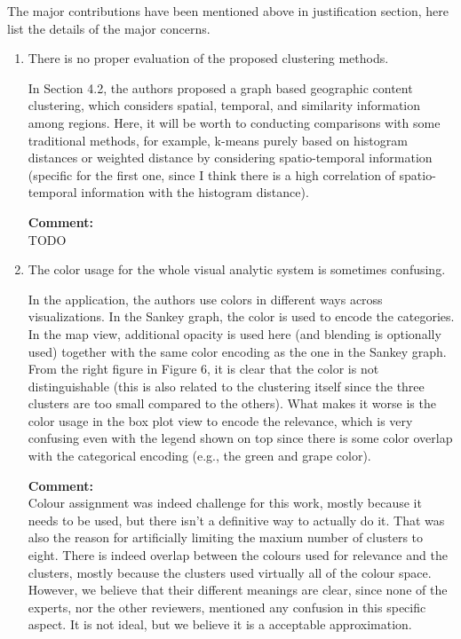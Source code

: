 \documentclass{article}
\newcommand{\reply}[1]{\begin{tcolorbox}\noindent\textbf{Comment:}\\#1\hfill\end{tcolorbox}}
\begin{document}
\begin{itemize}
{    The major contributions have been mentioned above in justification section, here
    list the details of the major concerns.
    \begin{enumerate}

    \item{There is no proper evaluation of the proposed clustering methods. 

    In Section 4.2, the authors proposed a graph based geographic content clustering,
    which considers spatial, temporal, and similarity information among regions. Here,
    it will be worth to conducting comparisons with some traditional methods, for
    example, k-means purely based on histogram distances or weighted distance by
    considering spatio-temporal information (specific for the first one, since I think
    there is a high correlation of spatio-temporal information with the histogram
    distance).
    \reply{TODO}
    }

    \item{The color usage for the whole visual analytic system is sometimes confusing. 

    In the application, the authors use colors in different ways across
    visualizations. In the Sankey graph, the color is used to encode the categories.
    In the map view, additional opacity is used here (and blending is optionally used)
    together with the same color encoding as the one in the Sankey graph. From the
    right figure in Figure 6, it is clear that the color is not distinguishable (this
    is also related to the clustering itself since the three clusters are too small
    compared to the others). What makes it worse is the color usage in the box plot
    view to encode the relevance, which is very confusing even with the legend shown
    on top since there is some color overlap with the categorical encoding (e.g., the
    green and grape color).

    \reply{Colour assignment was indeed challenge for this work, mostly because
    it needs to be used, but there isn't a definitive way to actually do it.
    That was also the reason for artificially limiting the maxium number of
    clusters to eight. There is indeed overlap between the colours used for
    relevance and the clusters, mostly because the clusters used virtually all
    of the colour space. However, we believe that their different meanings are
    clear, since none of the experts, nor the other reviewers, mentioned any
    confusion in this specific aspect. It is not ideal, but we believe it is a
    acceptable approximation.}}


\end{enumerate}}
\end{itemize}
\end{document}
